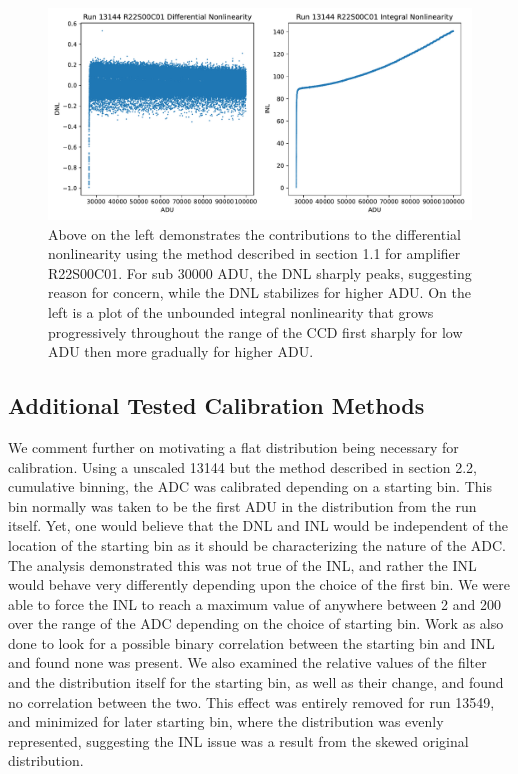 \documentclass[11pt, letterpaper]{article}
\begin{document}
\begin{figure}
    \centering
    \includegraphics[width=0.5\linewidth]{inldnl.pdf}
    \caption{Above on the left demonstrates the contributions to the differential nonlinearity using the method described in section 1.1 for amplifier R22S00C01. For sub 30000 ADU, the DNL sharply peaks, suggesting reason for concern, while the DNL stabilizes for higher ADU. On the left is a plot of the unbounded integral nonlinearity that grows progressively throughout the range of the CCD first sharply for low ADU then more gradually for higher ADU.}
\end{figure}

\subsection{Additional Tested Calibration Methods}

We comment further on motivating a flat distribution being necessary for calibration.
Using a unscaled 13144 but the method described in section 2.2, cumulative binning, the ADC was calibrated depending on a starting bin.
This bin normally was taken to be the first ADU in the distribution from the run itself. 
Yet, one would believe that the DNL and INL would be independent of the location of the starting bin as it should be characterizing the nature of the ADC.
The analysis demonstrated this was not true of the INL, and rather the INL would behave very differently depending upon the choice of the first bin. 
We were able to force the INL to reach a maximum value of anywhere between 2 and 200 over the range of the ADC depending on the choice of starting bin.
Work as also done to look for a possible binary correlation between the starting bin and INL and found none was present. 
We also examined the relative values of the filter and the distribution itself for the starting bin, as well as their change, and found no correlation between the two. 
This effect was entirely removed for run 13549, and minimized for later starting bin, where the distribution was evenly represented, suggesting the INL issue was a result from the skewed original distribution. 
 \indent 
 
\end{document}
